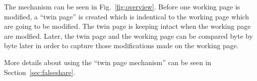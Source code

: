 The mechanism 
can be seen in Fig.~\ref{fig:overview}. 
Before one working page is modified, a ``twin page'' is created which is indentical
to the working page which are going to be modified. The twin page is keeping intact when the working
page are modfied. 
Later, the twin page and the working page can be compared byte by byte
later in order to capture those modifications made on the working page.

More details about using the ``twin page mechanism'' can be seen in Section~\ref{sec:falseshare}.
